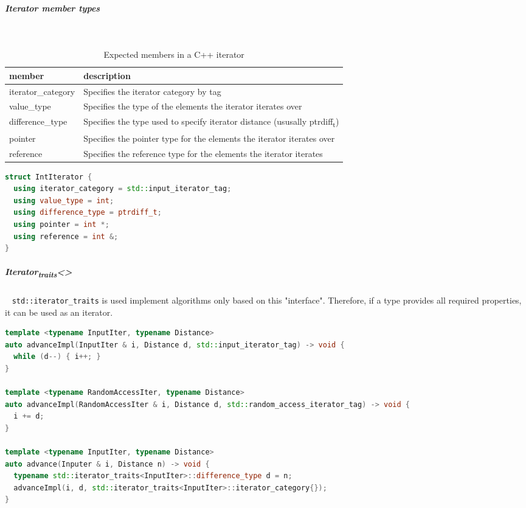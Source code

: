 \documentclass[11pt,twoside,landscape]{article}
\begin{document}
\begin{multicols}{2}
\subparagraph{Iterator member types} \
\label{sec:orgf07d3b7}
\begin{table}[htbp]
\caption{\label{tbl:expected-members-in-a-cpp-iterator}Expected members in a C++ iterator}
\centering
\begin{tabular}{ll}
member & description\\[0pt]
\hline
iterator\_category & Specifies the iterator category by tag\\[0pt]
value\_type & Specifies the type of the elements the iterator iterates over\\[0pt]
difference\_type & Specifies the type used to specify iterator distance (ususally ptrdiff\textsubscript{t})\\[0pt]
pointer & Specifies the pointer type for the elements the iterator iterates over\\[0pt]
reference & Specifies the reference type for the elements the iterator iterates\\[0pt]
\end{tabular}
\end{table}


\begin{lstlisting}[language=c++,label=lst:example-member-types-for-an-iterator,caption={Example member types for an iterator},captionpos=b,numbers=none]
struct IntIterator {
  using iterator_category = std::input_iterator_tag;
  using value_type = int;
  using difference_type = ptrdiff_t;
  using pointer = int *;
  using reference = int &;
}
\end{lstlisting}

\subparagraph{Iterator\textsubscript{traits}<>} \
\label{sec:org7543e01}
\texttt{std::iterator\_traits} is used implement algorithms only based on this "interface".
Therefore, if a type provides all required properties, it can be used as an iterator.

\begin{lstlisting}[language=c++,label=lst:example-usage-of-iterator_traits,caption={Example usage of iterator\textsubscript{traits}},captionpos=b,numbers=none]
template <typename InputIter, typename Distance>
auto advanceImpl(InputIter & i, Distance d, std::input_iterator_tag) -> void {
  while (d--) { i++; }
}

template <typename RandomAccessIter, typename Distance>
auto advanceImpl(RandomAccessIter & i, Distance d, std::random_access_iterator_tag) -> void {
  i += d;
}

template <typename InputIter, typename Distance>
auto advance(Inputer & i, Distance n) -> void {
  typename std::iterator_traits<InputIter>::difference_type d = n;
  advanceImpl(i, d, std::iterator_traits<InputIter>::iterator_category{});
}
\end{lstlisting}


\end{multicols}
\end{document}
